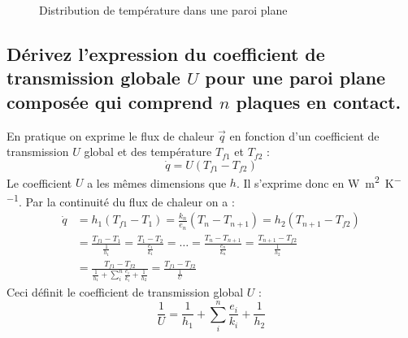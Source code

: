 \begin{figure}[p]\centering
    \caption{Distribution de température dans une paroi plane}
    \label{fig:q3_3}
\end{figure}

\subsection{Dérivez l'expression du coefficient de transmission globale $U$ pour une paroi plane composée qui comprend $n$ plaques en contact.}
En pratique on exprime le flux de chaleur $\vec{q}$ en fonction d'un coefficient de transmission $U$ global et des température $T_{f1}$ et $T_{f2}$ :
\begin{equation} \dot{q} = U(T_{f1} - T_{f2}) \end{equation}
Le coefficient $U$ a les mêmes dimensions que $h$. Il s'exprime donc en \si{\watt\per\meter\squared\per\kelvin}. Par la continuité du flux de chaleur on a :
\begin{align} \dot{q} &= h_1(T_{f1}-T_1) = \frac{k_n}{e_n}(T_n-T_{n+1}) = h_2(T_{n+1} - T_{f2}) \\ &= \frac{T_{f1}-T_1}{\frac{1}{h_1}} = \frac{T_1-T_2}{\frac{e_1}{k_1}} = \ldots = \frac{T_n-T_{n+1}}{\frac{e_n}{k_n}} = \frac{T_{n+1}-T_{f2}}{\frac{1}{h_2}} \\ &= \frac{T_{f1}-T_{f2}}{\frac{1}{h_1} + \sum_i^n\frac{e_i}{k_i} + \frac{1}{h_2}} = \frac{T_{f1} - T_{f2}}{\frac{1}{U}}\end{align}
Ceci définit le coefficient de transmission global $U$ :
\begin{equation} \frac{1}{U} = \frac{1}{h_1} + \sum_i^n\frac{e_i}{k_i} + \frac{1}{h_2} \end{equation}

